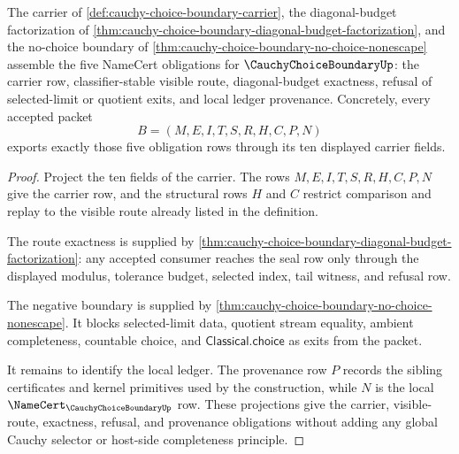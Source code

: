 \begin{theorem}
\label{thm:cauchy-choice-boundary-namecert-obligation-surface}
The carrier of \autoref{def:cauchy-choice-boundary-carrier}, the diagonal-budget factorization of \autoref{thm:cauchy-choice-boundary-diagonal-budget-factorization}, and the no-choice boundary of \autoref{thm:cauchy-choice-boundary-no-choice-nonescape} assemble the five NameCert obligations for $\CauchyChoiceBoundaryUp$: the carrier row, classifier-stable visible route, diagonal-budget exactness, refusal of selected-limit or quotient exits, and local ledger provenance. Concretely, every accepted packet
$$
B=(M,E,I,T,S,R,H,C,P,N)
$$
exports exactly those five obligation rows through its ten displayed carrier fields.
\end{theorem}
\begin{proof}
Project the ten fields of the carrier. The rows $M,E,I,T,S,R,H,C,P,N$ give the carrier row, and the structural rows $H$ and $C$ restrict comparison and replay to the visible route already listed in the definition.

The route exactness is supplied by \autoref{thm:cauchy-choice-boundary-diagonal-budget-factorization}: any accepted consumer reaches the seal row only through the displayed modulus, tolerance budget, selected index, tail witness, and refusal row.

The negative boundary is supplied by \autoref{thm:cauchy-choice-boundary-no-choice-nonescape}. It blocks selected-limit data, quotient stream equality, ambient completeness, countable choice, and $\mathsf{Classical.choice}$ as exits from the packet.

It remains to identify the local ledger. The provenance row $P$ records the sibling certificates and kernel primitives used by the construction, while $N$ is the local $\NameCert_{\CauchyChoiceBoundaryUp}$ row. These projections give the carrier, visible-route, exactness, refusal, and provenance obligations without adding any global Cauchy selector or host-side completeness principle.
\end{proof}

